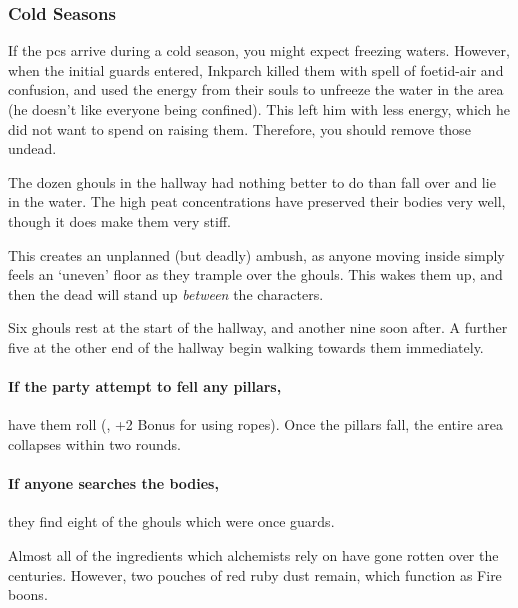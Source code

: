 \subsubsection*{Cold Seasons}

If the \glspl{pc} arrive during a cold season, you might expect freezing waters.
However, when the initial \glspl{guard} entered, Inkparch killed them with \gls{spell} of foetid-air and confusion, and used the energy from their souls to unfreeze the water in the area (he doesn't like everyone being confined).
This left him with less energy, which he did not want to spend on raising them.
Therefore, you should remove those undead.


The dozen ghouls in the hallway had nothing better to do than fall over and lie in the water.
The high peat concentrations have preserved their bodies very well, though it does make them very stiff.

This creates an unplanned (but deadly) ambush, as anyone moving inside simply feels an `uneven' floor as they trample over the ghouls.
This wakes them up, and then the dead will stand up \emph{between} the characters.

Six ghouls rest at the start of the hallway, and another nine soon after.
A further five at the other end of the hallway begin walking towards them immediately.

\paragraph{If the party attempt to fell any pillars,}
have them roll  (\tn[13], +2 Bonus for using ropes).
Once the pillars fall, the entire area collapses within two rounds.

\paragraph{If anyone searches the bodies,}
they find eight of the ghouls which were once \glspl{guard}.

\bookInvestigationChart[b]




Almost all of the \glspl{ingredient} which alchemists rely on have gone rotten over the centuries.
However, two pouches of red ruby dust remain, which function as Fire \glspl{boon}.

